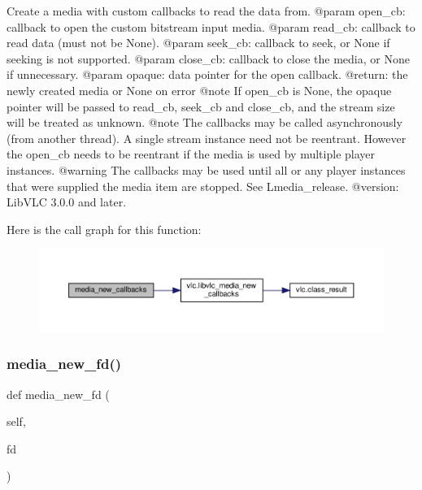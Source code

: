 \begin{DoxyVerb}Create a media with custom callbacks to read the data from.
@param open_cb: callback to open the custom bitstream input media.
@param read_cb: callback to read data (must not be None).
@param seek_cb: callback to seek, or None if seeking is not supported.
@param close_cb: callback to close the media, or None if unnecessary.
@param opaque: data pointer for the open callback.
@return: the newly created media or None on error @note If open_cb is None, the opaque pointer will be passed to read_cb, seek_cb and close_cb, and the stream size will be treated as unknown. @note The callbacks may be called asynchronously (from another thread). A single stream instance need not be reentrant. However the open_cb needs to be reentrant if the media is used by multiple player instances. @warning The callbacks may be used until all or any player instances that were supplied the media item are stopped. See L{media_release}.
@version: LibVLC 3.0.0 and later.
\end{DoxyVerb}
 Here is the call graph for this function\+:
\nopagebreak
\begin{figure}[H]
\begin{center}
\leavevmode
\includegraphics[width=350pt]{classvlc_1_1_instance_af8c03950a560c8a328a96276bd990d1f_cgraph}
\end{center}
\end{figure}
\mbox{\label{classvlc_1_1_instance_a60fb4f1457712151b617bdb9923e2fb4}} 
\subsubsection{\texorpdfstring{media\+\_\+new\+\_\+fd()}{media\_new\_fd()}}
{\footnotesize\ttfamily def media\+\_\+new\+\_\+fd (\begin{DoxyParamCaption}\item[{}]{self,  }\item[{}]{fd }\end{DoxyParamCaption})}

